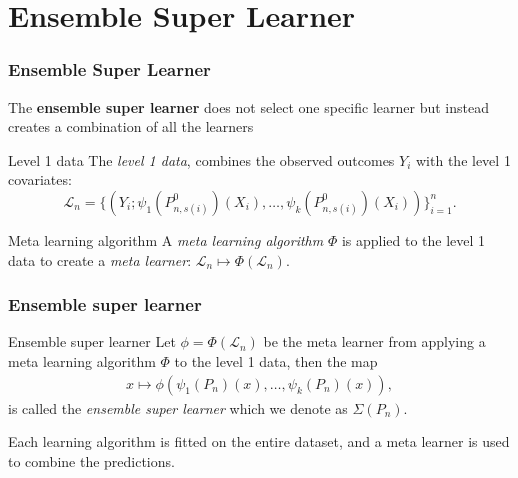 \documentclass{beamer}
\newcommand{\ml}{k}
\newcommand{\la}{\psi}
\newcommand{\lone}{\mathcal{L}}
\newcommand{\meta}{\phi}
\newcommand{\Meta}{\Phi}
\newcommand{\esl}{\Sigma}
\begin{document}
\section{Ensemble Super Learner}
\begin{frame}
  \frametitle{Ensemble Super Learner}
  The \textbf{ensemble super learner} does not select one specific learner but instead creates a combination of all the learners 
    \begin{block}{Level 1 data}
      The \textit{level 1 data},
      combines the observed outcomes $ Y_i $ with the level 1 covariates:
    \begin{equation*}
        \lone_{n}= \{(Y_i; \la_1(P_{n, s(i)}^{0})(X_i), \ldots, \la_\ml(P_{n, s(i)}^{0})(X_i)) \}_{i = 1}^n. 
    \end{equation*}
  \end{block}
  \vfill
    \begin{block}{Meta learning algorithm}
        A \textit{meta learning algorithm} $ \Meta $ is applied to the level 1 data to create a \textit{meta learner}: $ \lone_{n} \mapsto \Meta(\lone_{n})$. 
    \end{block}



\end{frame}
\begin{frame}\frametitle{Ensemble super learner}
    \begin{block}{Ensemble super learner}
    Let $ \meta = \Meta(\lone_{n}) $ be the meta learner from applying a meta learning algorithm $ \Meta $ to the level 1 data, then the map 
    \begin{align*}
       x \mapsto \meta(\la_1(P_{n})(x), \ldots, \la_k(P_{n})(x) ),
    \end{align*}
    is called the \textit{ensemble super learner} which we denote as $ \esl(P_n) $.%
  \end{block}
  \vfill
Each learning algorithm is fitted on the entire dataset, and a meta learner is used to combine the predictions.


\end{frame}
\end{document}
